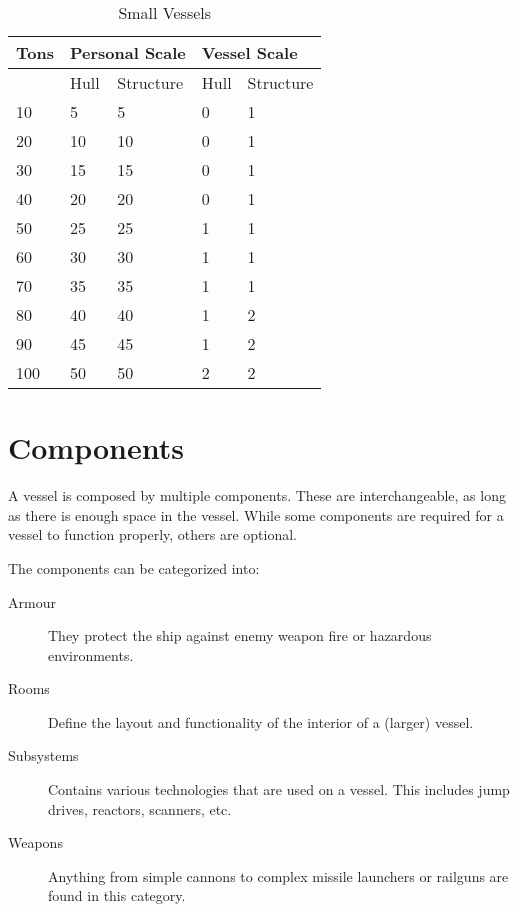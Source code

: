 \begin{table}[H]
  \centering
  \caption{Small Vessels}
  \begin{tabular}{|l|l|l|l|l|}
    \hline
    Tons & \multicolumn{2}{l|}{Personal Scale} & \multicolumn{2}{l|}{Vessel Scale} \\ \hline
    ~    & Hull           & Structure & Hull         & Structure \\ \hline
    10   & 5              & 5         & 0            & 1         \\ \hline
    20   & 10             & 10        & 0            & 1         \\ \hline
    30   & 15             & 15        & 0            & 1         \\ \hline
    40   & 20             & 20        & 0            & 1         \\ \hline
    50   & 25             & 25        & 1            & 1         \\ \hline
    60   & 30             & 30        & 1            & 1         \\ \hline
    70   & 35             & 35        & 1            & 1         \\ \hline
    80   & 40             & 40        & 1            & 2         \\ \hline
    90   & 45             & 45        & 1            & 2         \\ \hline
    100  & 50             & 50        & 2            & 2         \\ \hline
  \end{tabular}
\end{table}

\section{Components}
\label{sec:Components}

A vessel is composed by multiple components. These are interchangeable, as long as there is enough space in the vessel. While some components are required for a vessel to function properly, others are optional.

The components can be categorized into:
\begin{description}
  \item[Armour]
  They protect the ship against enemy weapon fire or hazardous environments.
  \item[Rooms]
  Define the layout and functionality of the interior of a (larger) vessel.
  \item[Subsystems]
  Contains various technologies that are used on a vessel. This includes jump drives, reactors, scanners, etc.
  \item[Weapons]
  Anything from simple cannons to complex missile launchers or railguns are found in this category.
\end{description}

